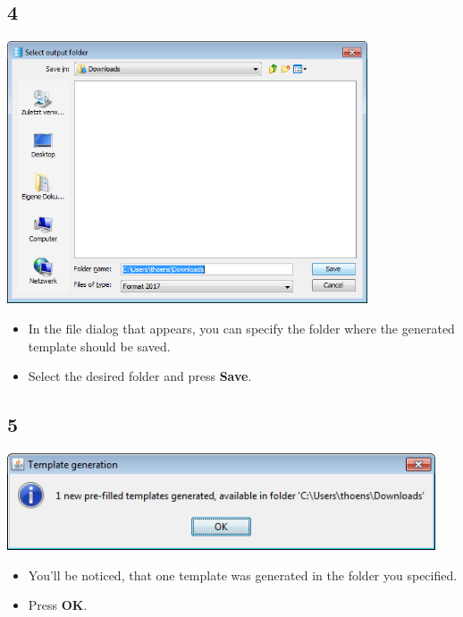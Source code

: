 \documentclass{beamer}
\begin{document}
\subsection{4}
\begin{frame}
	\begin{center}
  		\includegraphics[width=0.8\textwidth]{4.png}
	\end{center}
	\begin{itemize}
		\item In the file dialog that appears, you can specify the folder where the generated template should be saved.
		\item Select the desired folder and press \textbf{Save}.
	\end{itemize}
\end{frame}

\subsection{5}
\begin{frame}
	\begin{center}
  		\includegraphics[width=0.95\textwidth]{5.png}
	\end{center}
	\begin{itemize}
		\item You'll be noticed, that one template was generated in the folder you specified.
		\item Press \textbf{OK}.
	\end{itemize}
\end{frame}
\end{document}
